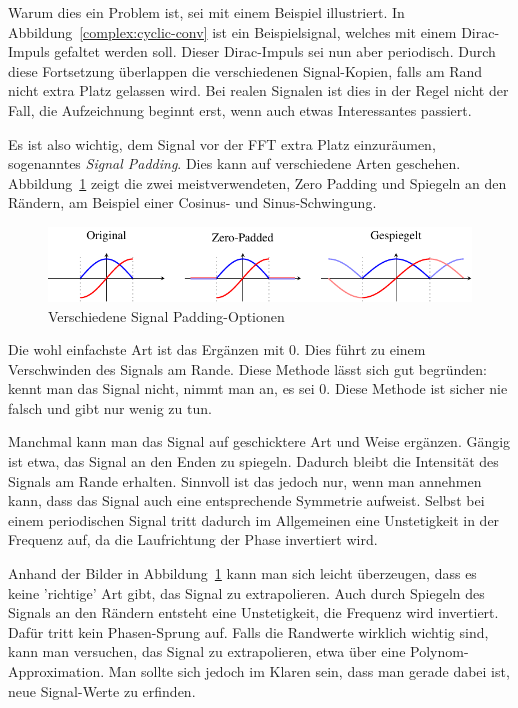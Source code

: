 Warum dies ein Problem ist, sei mit einem Beispiel illustriert.
In Abbildung~\ref{complex:cyclic-conv} ist ein Beispielsignal, welches mit einem Dirac-Impuls gefaltet werden soll.
Dieser Dirac-Impuls sei nun aber periodisch.
Durch diese Fortsetzung überlappen die verschiedenen Signal-Kopien, falls am Rand nicht extra Platz gelassen wird.
Bei realen Signalen ist dies in der Regel nicht der Fall, die Aufzeichnung beginnt erst, wenn auch etwas Interessantes passiert.

Es ist also wichtig, dem Signal vor der FFT extra Platz einzuräumen, sogenanntes \emph{Signal Padding}.
Dies kann auf verschiedene Arten geschehen.
Abbildung~\ref{complex:padding} zeigt die zwei meistverwendeten, Zero Padding und Spiegeln an den Rändern, am Beispiel einer Cosinus- und Sinus-Schwingung.
\begin{figure}
	\centering
	\includegraphics{papers/complex/images/signal_padding.pdf}
	\caption{Verschiedene Signal Padding-Optionen}
	\label{complex:padding}
\end{figure}

Die wohl einfachste Art ist das Ergänzen mit $0$.
Dies führt zu einem Verschwinden des Signals am Rande.
Diese Methode lässt sich gut begründen: kennt man das Signal nicht, nimmt man an, es sei $0$.
Diese Methode ist sicher nie falsch und gibt nur wenig zu tun.

Manchmal kann man das Signal auf geschicktere Art und Weise ergänzen.
Gängig ist etwa, das Signal an den Enden zu spiegeln.
Dadurch bleibt die Intensität des Signals am Rande erhalten.
Sinnvoll ist das jedoch nur, wenn man annehmen kann, dass das Signal auch eine entsprechende Symmetrie aufweist.
Selbst bei einem periodischen Signal tritt dadurch im Allgemeinen eine Unstetigkeit in der Frequenz auf, da die Laufrichtung der Phase invertiert wird.

Anhand der Bilder in Abbildung~\ref{complex:padding} kann man sich leicht überzeugen, dass es keine 'richtige' Art gibt, das Signal zu extrapolieren.
Auch durch Spiegeln des Signals an den Rändern entsteht eine Unstetigkeit, die Frequenz wird invertiert. Dafür tritt kein Phasen-Sprung auf.
Falls die Randwerte wirklich wichtig sind, kann man versuchen, das Signal zu extrapolieren, etwa über eine Polynom-Approximation.
Man sollte sich jedoch im Klaren sein, dass man gerade dabei ist, neue Signal-Werte zu erfinden.

